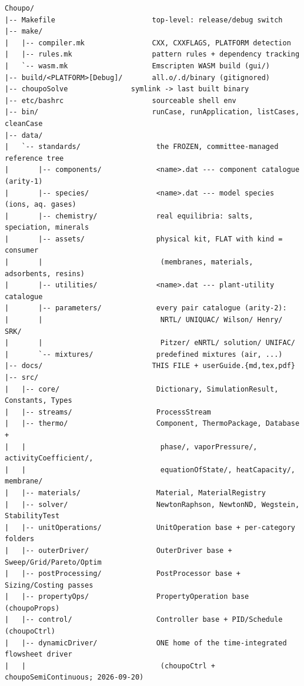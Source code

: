 \documentclass[11pt,a4paper]{article}
\begin{document}
\begin{lstlisting}
Choupo/
|-- Makefile                       top-level: release/debug switch
|-- make/
|   |-- compiler.mk                CXX, CXXFLAGS, PLATFORM detection
|   |-- rules.mk                   pattern rules + dependency tracking
|   `-- wasm.mk                    Emscripten WASM build (gui/)
|-- build/<PLATFORM>[Debug]/       all.o/.d/binary (gitignored)
|-- choupoSolve               symlink -> last built binary
|-- etc/bashrc                     sourceable shell env
|-- bin/                           runCase, runApplication, listCases, cleanCase
|-- data/
|   `-- standards/                  the FROZEN, committee-managed reference tree
|       |-- components/             <name>.dat --- component catalogue (arity-1)
|       |-- species/                <name>.dat --- model species (ions, aq. gases)
|       |-- chemistry/              real equilibria: salts, speciation, minerals
|       |-- assets/                 physical kit, FLAT with kind = consumer
|       |                            (membranes, materials, adsorbents, resins)
|       |-- utilities/              <name>.dat --- plant-utility catalogue
|       |-- parameters/             every pair catalogue (arity-2):
|       |                            NRTL/ UNIQUAC/ Wilson/ Henry/ SRK/
|       |                            Pitzer/ eNRTL/ solution/ UNIFAC/
|       `-- mixtures/               predefined mixtures (air, ...)
|-- docs/                          THIS FILE + userGuide.{md,tex,pdf}
|-- src/
|   |-- core/                       Dictionary, SimulationResult, Constants, Types
|   |-- streams/                    ProcessStream
|   |-- thermo/                     Component, ThermoPackage, Database +
|   |                                phase/, vaporPressure/, activityCoefficient/,
|   |                                equationOfState/, heatCapacity/, membrane/
|   |-- materials/                  Material, MaterialRegistry
|   |-- solver/                     NewtonRaphson, NewtonND, Wegstein, StabilityTest
|   |-- unitOperations/             UnitOperation base + per-category folders
|   |-- outerDriver/                OuterDriver base + Sweep/Grid/Pareto/Optim
|   |-- postProcessing/             PostProcessor base + Sizing/Costing passes
|   |-- propertyOps/                PropertyOperation base (choupoProps)
|   |-- control/                    Controller base + PID/Schedule (choupoCtrl)
|   |-- dynamicDriver/              ONE home of the time-integrated flowsheet driver
|   |                                (choupoCtrl + choupoSemiContinuous; 2026-09-20)

\end{lstlisting}
\end{document}
